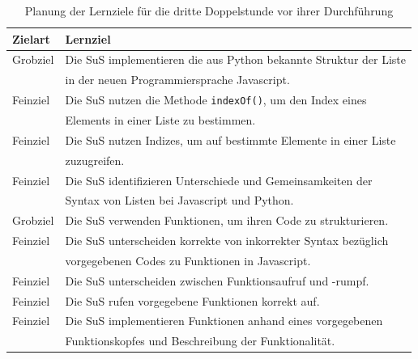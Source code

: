 \begin{table}[h!]
\begin{tabular*}{\linewidth}{l|l}
	\hline
	\textbf{Zielart} & \textbf{Lernziel}\\
	\hline \hline
	Grobziel & Die SuS implementieren die aus Python bekannte Struktur der Liste\\
	& in der neuen Programmiersprache Javascript.\\
	Feinziel & Die SuS nutzen die Methode \texttt{indexOf()}, um den Index eines\\
	& Elements in einer Liste zu bestimmen.\\
	Feinziel & Die SuS nutzen Indizes, um auf bestimmte Elemente in einer Liste\\
	& zuzugreifen.\\
	Feinziel & Die SuS identifizieren Unterschiede und Gemeinsamkeiten der\\
	& Syntax von Listen bei Javascript und Python.\\
	Grobziel & Die SuS verwenden Funktionen, um ihren Code zu strukturieren.\\
	Feinziel & Die SuS unterscheiden korrekte von inkorrekter Syntax bezüglich\\
	& vorgegebenen Codes zu Funktionen in Javascript.\\
	Feinziel & Die SuS unterscheiden zwischen Funktionsaufruf und -rumpf.\\
	Feinziel & Die SuS rufen vorgegebene Funktionen korrekt auf.\\
	Feinziel & Die SuS implementieren Funktionen anhand eines vorgegebenen\\
	& Funktionskopfes und Beschreibung der Funktionalität.\\
	\hline
\end{tabular*}
\caption{Planung der Lernziele für die dritte Doppelstunde vor ihrer Durchführung}
\label{tab:lernziele-3-vorher}
\end{table}

